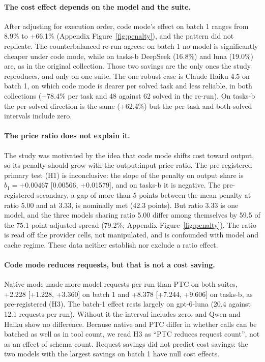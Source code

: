 \documentclass[10pt]{article}
\newcommand*{\mi}{\textminus}   %
\begin{document}
\paragraph{The cost effect depends on the model and the suite.} After adjusting for execution order,
code mode's effect on batch 1 ranges from \mi{}8.9\% to +66.1\% (Appendix Figure~\ref{fig:penalty}), and the
pattern did not replicate. The counterbalanced re-run agrees: on batch 1 no model is significantly
cheaper under code mode, while on tasks-b DeepSeek (\mi{}16.8\%) and luna (\mi{}19.0\%) are, as in the
original collection. Those two savings are the only ones the study reproduces, and only on one suite.
The one robust case is Claude Haiku 4.5 on batch 1, on which code mode is dearer per solved task
and less reliable, in both collections (+78.4\% per task and 48 against 62 solved in
the re-run). On tasks-b the per-solved direction is the same (+62.4\%) but the per-task and both-solved
intervals include zero.

\paragraph{The price ratio does not explain it.} The study was motivated by the idea that code mode
shifts cost toward output, so its penalty should grow with the output:input price ratio. The
pre-registered primary test (H1) is inconclusive: the slope of the penalty on output share is
$b_1 = +0.00467$ [\mi{}0.00566, +0.01579], and on tasks-b it is negative. The pre-registered secondary,
a gap of more than 5 points between the mean penalty at ratio 5.00 and at 3.33, is nominally met
(42.3 points). But ratio 3.33 is one model, and the three models sharing ratio 5.00 differ among
themselves by 59.5 of the 75.1-point adjusted spread (79.2\%; Appendix Figure~\ref{fig:penalty}). The ratio is read off the provider
cells, not manipulated, and is confounded with model and cache regime. These data neither establish
nor exclude a ratio effect.

\paragraph{Code mode reduces requests, but that is not a cost saving.} Native mode made more model
requests per run than PTC on both suites, +2.228 [+1.228, +3.360] on batch 1 and +8.378 [+7.244,
+9.606] on tasks-b, as pre-registered (H3). The batch-1 effect rests largely on gpt-6-luna (20.4
against 12.1 requests per run). Without it the interval includes zero, and Qwen and Haiku show no
difference. Because native and PTC differ in whether calls can be batched as well as in tool count, we
read H3 as ``PTC reduces request count'', not as an effect of schema count. Request savings did not
predict cost savings: the two models with the largest savings on batch 1 have null cost effects.
\end{document}
